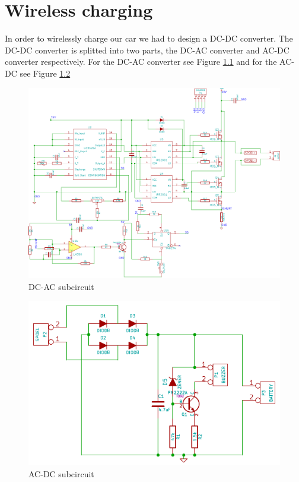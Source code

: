 \documentclass[final]{scrreprt} %
\begin{document}
\chapter{Wireless charging}
In order to wirelessly charge our car we had to design a DC-DC converter. The DC-DC converter is splitted into two parts, the DC-AC converter and AC-DC converter respectively. 
For the DC-AC converter see Figure \ref{fig:DC-AC} and for the AC-DC see Figure \ref{fig:AC-DC}

\begin{figure}[h]
	\includegraphics[width=\linewidth]{resources/DC-AC-rc.pdf}
	\caption{DC-AC subcircuit}
	\label{fig:DC-AC}
\end{figure}

\begin{figure}[h]
	\includegraphics[width=\linewidth]{resources/AC-DC-rc.pdf}
	\caption{AC-DC subcircuit}
	\label{fig:AC-DC}
\end{figure}
\end{document}
